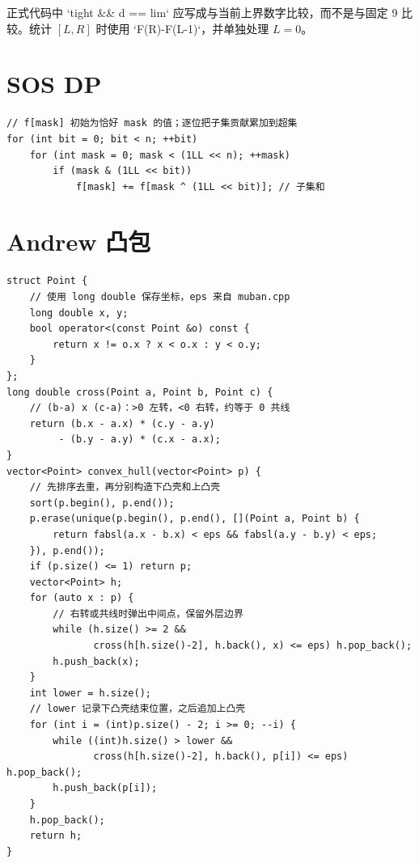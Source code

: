\begin{warnbox}
正式代码中 `tight \&\& d == lim` 应写成与当前上界数字比较，而不是与固定 9 比较。统计 \([L,R]\) 时使用 `F(R)-F(L-1)`，并单独处理 \(L=0\)。
\end{warnbox}

\section{SOS DP}


\begin{lstlisting}[style=cpp]
// f[mask] 初始为恰好 mask 的值；逐位把子集贡献累加到超集
for (int bit = 0; bit < n; ++bit)
    for (int mask = 0; mask < (1LL << n); ++mask)
        if (mask & (1LL << bit))
            f[mask] += f[mask ^ (1LL << bit)]; // 子集和
\end{lstlisting}

\section{Andrew 凸包}


\begin{lstlisting}[style=cpp]
struct Point {
    // 使用 long double 保存坐标，eps 来自 muban.cpp
    long double x, y;
    bool operator<(const Point &o) const {
        return x != o.x ? x < o.x : y < o.y;
    }
};
long double cross(Point a, Point b, Point c) {
    // (b-a) x (c-a)：>0 左转，<0 右转，约等于 0 共线
    return (b.x - a.x) * (c.y - a.y)
         - (b.y - a.y) * (c.x - a.x);
}
vector<Point> convex_hull(vector<Point> p) {
    // 先排序去重，再分别构造下凸壳和上凸壳
    sort(p.begin(), p.end());
    p.erase(unique(p.begin(), p.end(), [](Point a, Point b) {
        return fabsl(a.x - b.x) < eps && fabsl(a.y - b.y) < eps;
    }), p.end());
    if (p.size() <= 1) return p;
    vector<Point> h;
    for (auto x : p) {
        // 右转或共线时弹出中间点，保留外层边界
        while (h.size() >= 2 &&
               cross(h[h.size()-2], h.back(), x) <= eps) h.pop_back();
        h.push_back(x);
    }
    int lower = h.size();
    // lower 记录下凸壳结束位置，之后追加上凸壳
    for (int i = (int)p.size() - 2; i >= 0; --i) {
        while ((int)h.size() > lower &&
               cross(h[h.size()-2], h.back(), p[i]) <= eps) h.pop_back();
        h.push_back(p[i]);
    }
    h.pop_back();
    return h;
}
\end{lstlisting}

